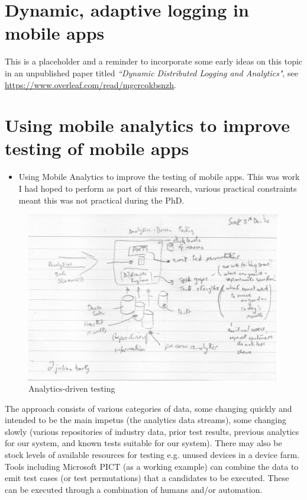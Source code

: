 \section{Dynamic, adaptive logging in mobile apps}
This is a placeholder and a reminder to incorporate some early ideas on this topic in an unpublished paper titled \emph{``Dynamic Distributed Logging and Analytics"}, see \url{https://www.overleaf.com/read/mgcrcqkbsnzh}.



\section{Using mobile analytics to improve testing of mobile apps}
\begin{itemize}
    \item Using Mobile Analytics to improve the testing of mobile apps. This was work I had hoped to perform as part of this research, various practical constraints meant this was not practical during the PhD.
\end{itemize}

\begin{figure}[!htbp]
    \centering
    \includegraphics[width=\textwidth]{images/rough-sketches/Analytics-driven-testing-including-PICT.jpeg}
    \caption{Analytics-driven testing}
    \label{fig:roughsketch:analytics-driven-testing-incl-PICT}
\end{figure}

The approach consists of various categories of data, some changing quickly and intended to be the main impetus (the analytics data streams), some changing slowly (various repositories of industry data, prior test results, previous analytics for our system, and known tests suitable for our system). There may also be stock levels of available resources for testing e.g. unused devices in a device farm.
Tools including Microsoft PICT (as a working example) can combine the data to emit test cases (or test permutations) that a candidates to be executed. These can be executed through a combination of humans and/or automation. 

